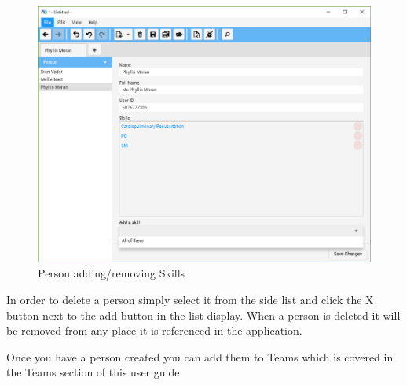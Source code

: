 \begin{figure}[H]
\centering
\includegraphics[width=\textwidth]{images/screenshots/people3.PNG}
\caption{Person adding/removing Skills}
\label{fig:new_project}
\end{figure}

In order to delete a person simply select it from the side list and click the X button next to the add button in the list display. When a person is deleted it will be removed from any place it is referenced in the application.

Once you have a person created you can add them to Teams which is covered in the Teams section of this user guide.